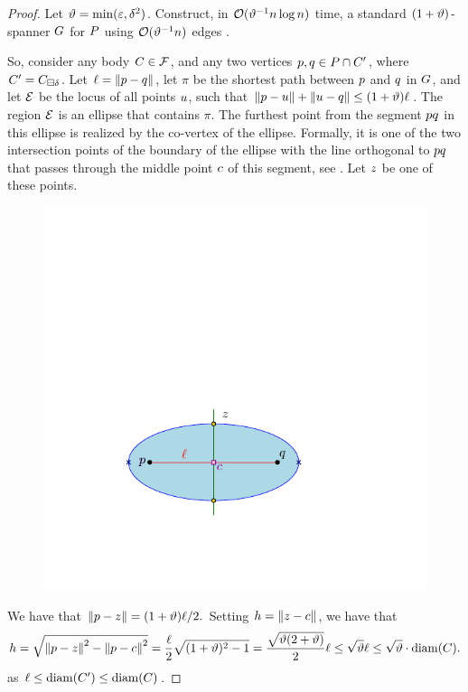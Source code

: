 \documentclass[12pt]{article}%
\begin{document}
\begin{proof}
    Let $\vartheta = \min( \varepsilon, \delta^2)$. Construct, in
    $\mathcal{O}(\vartheta^{-1} n \log n)$ time, a standard $(1+\vartheta)$-spanner $G$
    for $P$ using $\mathcal{O}( \vartheta^{-1} n)$ edges \cite{ams-dagss-99}.

    So, consider any body $C \in \mathcal{F}$, and any two vertices
    $p, q \in P \cap C'$, where
    $C'=C_{\boxminus \delta}$. Let $\ell = \left\| p - q \right\|$, 
    let $\pi$ be the shortest path between $p$ and $q$ in $G$, and let
    $\mathcal{E}$ be the locus of all points $u$, such that
    $\left\| p - u \right\| + \left\| u - q \right\| \leq (1+\vartheta) \ell$. The region
    $\mathcal{E}$ is an ellipse that contains $\pi$. The furthest point from
    the segment $pq$ in this ellipse is realized by the co-vertex
    of the ellipse. Formally, it is one of the two intersection points
    of the boundary of the ellipse with the line orthogonal to
    $p q$ that passes through the middle point $c$ of this
    segment, see . Let $z$ be one of these points.

    \begin{figure}[h]
        \centerline{\includegraphics{figs/ellipse}}
        \caption{}
    \end{figure}

    We have that
    \begin{math}
        \left\| p - z \right\| = (1+\vartheta)\ell/2.
    \end{math}
    Setting $h = \left\| z - c \right\|$, we have that
    \begin{equation*}
        h%
        =%
        \sqrt{\dY{\pa}{\pz}^2 - \dY{\pa}{\cen}^2 }
        =%
        \frac{\ell}{2} \sqrt{(1+\epsA)^2 - 1}
        =%
        \frac{\sqrt{\epsA (2+\epsA)}}{2} \ell%
        \leq 
        \sqrt{\epsA} \ell
        \leq 
        \sqrt{\epsA}\cdot \diameterX{\body}.
    \end{equation*}
    as $\ell \leq \diameterX{\body'} \leq \diameterX{\body}$.


\end{proof}
\end{document}
